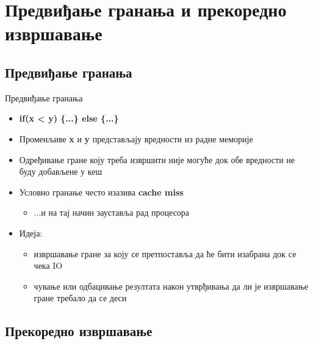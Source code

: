 \documentclass{beamer}
\begin{document}
    \section{Предвиђање гранања и прекоредно извршавање}
    \subsection{Предвиђање гранања}
    
    \begin{frame}{Предвиђање гранања}
        \begin{itemize}
            \item \textbf{if(x < y) \{...\} else \{...\}}
            \item Променљиве \textbf{x} и \textbf{y} представљају вредности из радне меморије 
            \item Одређивање гране коју треба извршити није могуће док обе вредности не буду добављене у кеш
            \item Условно гранање често изазива \textbf{cache miss}
            \begin{itemize}
                \item ...и на тај начин зауставља рад процесора
            \end{itemize}
            \item Идеја:
            \begin{itemize}
                \item извршавање гране за коју се претпоставља да ће бити изабрана док се чека IO
                \item чување или одбацивање резултата након утврђивања да ли је извршавање гране требало да се деси
            \end{itemize}
        \end{itemize}
    \end{frame}
    
    \subsection{Прекоредно извршавање}
    
\end{document}
